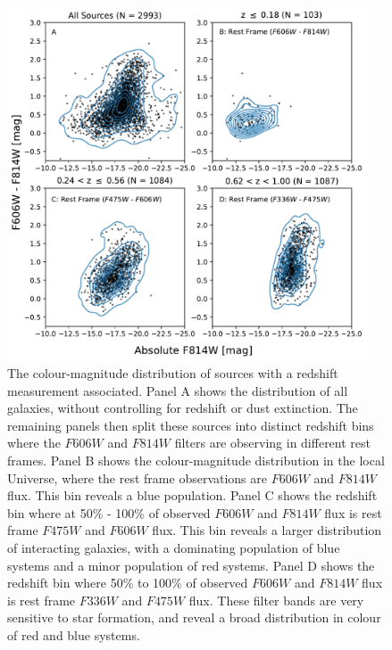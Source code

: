 {\begin{figure}
  \centering
  \includegraphics[width=0.95\textwidth]{Chapter2/figures/fig13.pdf}
  \caption[The colour-magnitude distribution of sources with a redshift measurement associated.]{The colour-magnitude distribution of sources with a redshift measurement associated. Panel A shows the distribution of all galaxies, without controlling for redshift or dust extinction. The remaining panels then split these sources into distinct redshift bins where the $F606W$ and $F814W$ filters are observing in different rest frames. Panel B shows the colour-magnitude distribution in the local Universe, where the rest frame observations are $F606W$ and $F814W$ flux. This bin reveals a blue population. Panel C shows the redshift bin where at 50\% - 100\% of observed $F606W$ and $F814W$ flux is rest frame $F475W$ and $F606W$ flux. This bin reveals a larger distribution of interacting galaxies, with a dominating population of blue systems and a minor population of red systems. Panel D shows the redshift bin where 50\% to 100\% of observed $F606W$ and $F814W$ flux is rest frame $F336W$ and $F475W$ flux. These filter bands are very sensitive to star formation, and reveal a broad distribution in colour of red and blue systems.}
  \label{fig:colour-magnitude}
\end{figure}

}
